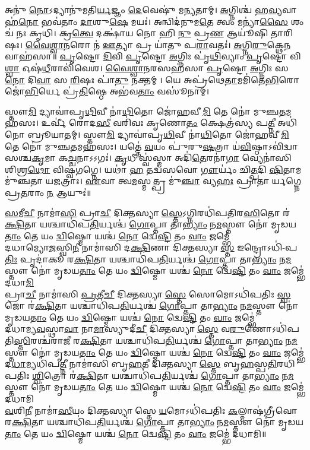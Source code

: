 𑌅𑌨𑍁॑ \ul{𑌨𑍋}𑌽𑌦𑍍𑌯𑌾𑌨𑍁॑𑌮𑌤𑌿\ul{𑌰𑍍𑌯}𑌜𑍍𑌞𑌂 \ul{𑌦𑍇}𑌵𑍇𑌷𑍁॑ 𑌮𑌨𑍍𑌯𑌤𑌾𑌮𑍍। \ul{𑌅}𑌗𑍍𑌨𑌿𑌶𑍍𑌚॑ 𑌹\ul{𑌵𑍍𑌯}𑌵𑌾𑌹॑\ul{𑌨𑍋} 𑌭𑌵॑𑌤𑌾𑌂 \ul{𑌦𑌾}𑌶𑍁\ul{𑌷𑍇} 𑌮𑌯𑌃॑। 𑌅𑌨𑍍𑌵𑌿𑌦॑𑌨𑍁𑌮\ul{𑌤𑍇} 𑌤𑍍𑌵𑌂 𑌮𑌨𑍍𑌯𑌾॑\ul{𑌸𑍈} 𑌶𑌂 𑌚॑ 𑌨𑌃 𑌕𑍃𑌧𑌿। 𑌕𑍍𑌰\ul{𑌤𑍍𑌵𑍇} 𑌦𑌕𑍍𑌷𑌾॑𑌯 𑌨𑍋 𑌹𑌿 \ul{𑌨𑍁} 𑌪𑍍𑌰\ul{𑌣} 𑌆𑌯𑍂॑𑌷𑌿 𑌤𑌾𑌰𑌿𑌷𑌃।
\ul{𑌵𑍈}\ul{𑌶𑍍𑌵𑌾}\ul{𑌨}𑌰𑍋 𑌨॑ \ul{𑌊}𑌤𑍍𑌯𑌾 𑌪𑍍𑌰 𑌯𑌾॑𑌤𑍁  𑌪\ul{𑌰𑌾}𑌵𑌤𑌃॑। \ul{𑌅}𑌗𑍍𑌨𑌿\ul{𑌰𑍁}𑌕𑍍𑌥𑍇\ul{𑌨} 𑌵𑌾𑌹॑𑌸𑌾॥
\ul{𑌪𑍃}𑌷𑍍𑌟𑍋 \ul{𑌦𑌿}𑌵𑌿 \ul{𑌪𑍃}𑌷𑍍𑌟𑍋 \ul{𑌅}𑌗𑍍𑌨𑌿𑌃 𑌪𑍃॑\ul{𑌥𑌿}𑌵𑍍𑌯𑌾𑌂 \ul{𑌪𑍃}𑌷𑍍𑌟𑍋 𑌵𑌿\ul{𑌶𑍍𑌵𑌾} 𑌓𑌷॑\ul{𑌧𑍀}𑌰𑌾𑌵𑌿॑𑌵𑍇𑌶। \ul{𑌵𑍈}\ul{𑌶𑍍𑌵𑌾}\ul{𑌨}𑌰𑌸𑌹॑𑌸𑌾 \ul{𑌪𑍃}𑌷𑍍𑌟𑍋 \ul{𑌅}𑌗𑍍𑌨𑌿𑌃 𑌸 \ul{𑌨𑍋} 𑌦𑌿\ul{𑌵𑌾} 𑌸 \ul{𑌰𑌿}𑌷𑌃 𑌪𑌾॑\ul{𑌤𑍁} 𑌨𑌕𑍍𑌤𑌮𑍍।  𑌯𑍇 𑌅𑌪𑍍𑌰॑𑌥𑍇\ul{𑌤𑌾}𑌮𑌮𑌿॑𑌤𑍇\ul{𑌭𑌿}𑌰𑍋𑌜𑍋॑\ul{𑌭𑌿}𑌰𑍍𑌯𑍇 𑌪𑍍𑌰॑\ul{𑌤𑌿}𑌷𑍍𑌠𑍇 𑌅𑌭॑𑌵\ul{𑌤𑌾𑌂} 𑌵𑌸𑍂॑𑌨𑌾𑌮𑍍। 

𑌸𑍍𑌤𑍗\ul{𑌮𑌿} 𑌦𑍍𑌯𑌾𑌵𑌾॑𑌪𑍃\ul{𑌥𑌿}𑌵𑍀 𑌨𑌾॑\ul{𑌥𑌿}𑌤𑍋 𑌜𑍋॑𑌹𑌵𑍀\ul{𑌮𑌿} 𑌤𑍇 𑌨𑍋॑ 𑌮𑍁𑌞𑍍𑌚\ul{𑌤}𑌮𑌹॑𑌸𑌃। 𑌉𑌰𑍍𑌵𑍀॑ 𑌰𑍋𑌦\ul{𑌸𑍀} 𑌵𑌰𑌿॑𑌵𑌃 𑌕𑍃𑌣𑍋\ul{𑌤𑌂} 𑌕𑍍𑌷𑍇𑌤𑍍𑌰॑𑌸𑍍𑌯 𑌪\ul{𑌤𑍍𑌨𑍀} 𑌅𑌧𑌿॑ 𑌨𑍋 𑌬𑍍𑌰𑍂𑌯𑌾𑌤𑌮𑍍। 
𑌸𑍍𑌤𑍗\ul{𑌮𑌿} 𑌦𑍍𑌯𑌾𑌵𑌾॑𑌪𑍃\ul{𑌥𑌿}𑌵𑍀 𑌨𑌾॑\ul{𑌥𑌿}𑌤𑍋 𑌜𑍋॑𑌹𑌵𑍀\ul{𑌮𑌿} 𑌤𑍇 𑌨𑍋॑ 𑌮𑍁𑌞𑍍𑌚\ul{𑌤}𑌮𑌹॑𑌸𑌃। 𑌯𑌤𑍍𑌤𑍇॑ \ul{𑌵}𑌯𑌂 𑌪𑍁॑𑌰𑍁\ul{𑌷}𑌤𑍍𑌰𑌾 𑌯॑\ul{𑌵𑌿}𑌷𑍍𑌠𑌾𑌽𑌵𑌿॑𑌦𑍍𑌵𑌾𑌸𑌶𑍍𑌚\ul{𑌕𑍃}𑌮𑌾 𑌕\ul{𑌚𑍍𑌚}𑌨𑌾𑌽𑌽𑌗𑌃॑। 
\ul{𑌕𑍃}𑌧𑍀 𑌸𑍍𑌵॑𑌸𑍍𑌮𑌾 𑌅𑌦𑌿॑\ul{𑌤𑍇}𑌰𑌨𑌾॑\ul{𑌗𑌾} 𑌵𑍍𑌯𑍇𑌨𑌾॑𑌸𑌿 𑌶𑌿𑌶𑍍𑌰\ul{𑌥𑍋} 𑌵𑌿𑌷𑍍𑌵॑𑌗𑌗𑍍𑌨𑍇। 𑌯𑌥𑌾॑ \ul{𑌹} 𑌤𑌦𑍍𑌵॑𑌸𑌵𑍋 \ul{𑌗𑍗}𑌰𑍍𑌯𑌂॑ 𑌚𑌿\ul{𑌤𑍍𑌪}𑌦𑌿 \ul{𑌷𑌿}𑌤𑌾𑌮𑌮𑍁॑𑌞𑍍𑌚𑌤𑌾 𑌯𑌜𑌤𑍍𑌰𑌾𑌃। \ul{𑌏}𑌵𑌾 𑌤𑍍𑌵\ul{𑌮}𑌸𑍍𑌮𑌤𑍍𑌪𑍍𑌰 𑌮𑍁॑\ul{𑌞𑍍𑌚𑌾} 𑌵𑍍𑌯\ul{𑌹𑌃} 𑌪𑍍𑌰𑌾𑌤𑌾𑌰𑍍𑌯𑌗𑍍𑌨𑍇 𑌪𑍍𑌰\ul{𑌤}𑌰𑌾𑌂 \ul{𑌨} 𑌆𑌯𑍁𑌃॑॥

\ul{𑌸}𑌮𑍀\ul{𑌚𑍀} 𑌨𑌾𑌮𑌾॑\ul{𑌸𑌿} 𑌪𑍍𑌰𑌾\ul{𑌚𑍀} 𑌦𑌿𑌕𑍍𑌤𑌸𑍍𑌯𑌾\ul{𑌸𑍍𑌤𑍇}𑌽𑌗𑍍𑌨𑌿𑌰𑌧𑌿॑\-𑌪𑌤𑌿𑌰\ul{𑌸𑌿}𑌤𑍋 𑌰॑\ul{𑌕𑍍𑌷𑌿}𑌤𑌾 
𑌯𑌶𑍍𑌚𑌾𑌧𑌿॑𑌪\ul{𑌤𑌿}𑌰𑍍𑌯𑌶𑍍𑌚॑ \ul{𑌗𑍋}𑌪𑍍𑌤𑌾 𑌤𑌾\ul{𑌭𑍍𑌯𑌾𑌂} 𑌨\ul{𑌮}𑌸𑍍𑌤𑍗 𑌨𑍋॑ 𑌮𑍃𑌡𑌯\ul{𑌤𑌾𑌂} 𑌤𑍇 
𑌯𑌂 \ul{𑌦𑍍𑌵𑌿}𑌷𑍍𑌮𑍋 𑌯𑌶𑍍𑌚॑ \ul{𑌨𑍋} 𑌦𑍍𑌵𑍇\ul{𑌷𑍍𑌟𑌿} 𑌤𑌂 \ul{𑌵𑌾𑌂} 𑌜𑌮𑍍𑌭𑍇॑\\
𑌦𑌧𑌾𑌮𑍍𑌯𑍋\ul{𑌜}𑌸𑍍𑌵𑌿\ul{𑌨𑍀} 𑌨𑌾𑌮𑌾॑𑌸𑌿 𑌦\ul{𑌕𑍍𑌷𑌿}𑌣𑌾 𑌦𑌿𑌕𑍍𑌤𑌸𑍍𑌯𑌾\ul{𑌸𑍍𑌤} 𑌇𑌨𑍍𑌦𑍍𑌰𑍋𑌽𑌧𑌿॑-𑌪\ul{𑌤𑌿𑌃} 𑌪𑍃𑌦𑌾॑𑌕𑍂 𑌰\ul{𑌕𑍍𑌷𑌿}𑌤𑌾 
𑌯𑌶𑍍𑌚𑌾𑌧𑌿॑𑌪\ul{𑌤𑌿}𑌰𑍍𑌯𑌶𑍍𑌚॑ \ul{𑌗𑍋}𑌪𑍍𑌤𑌾 𑌤𑌾\ul{𑌭𑍍𑌯𑌾𑌂} 𑌨\ul{𑌮}𑌸𑍍𑌤𑍗 𑌨𑍋॑ 𑌮𑍃𑌡𑌯\ul{𑌤𑌾𑌂} 𑌤𑍇 
𑌯𑌂 \ul{𑌦𑍍𑌵𑌿}𑌷𑍍𑌮𑍋 𑌯𑌶𑍍𑌚॑ \ul{𑌨𑍋} 𑌦𑍍𑌵𑍇\ul{𑌷𑍍𑌟𑌿} 𑌤𑌂 \ul{𑌵𑌾𑌂} 𑌜𑌮𑍍𑌭𑍇॑ 𑌦𑌧𑌾\ul{𑌮𑌿}\\ 
𑌪𑍍𑌰𑌾\ul{𑌚𑍀} 𑌨𑌾𑌮𑌾॑𑌸𑌿 \ul{𑌪𑍍𑌰}𑌤𑍀\ul{𑌚𑍀} 𑌦𑌿𑌕𑍍𑌤𑌸𑍍𑌯𑌾\ul{𑌸𑍍𑌤𑍇} 𑌸𑍋𑌮𑍋𑌽𑌧𑌿॑\-𑌪𑌤𑌿𑌃 \ul{𑌸𑍍𑌵}𑌜𑍋 𑌰॑\ul{𑌕𑍍𑌷𑌿}𑌤𑌾 
𑌯𑌶𑍍𑌚𑌾𑌧𑌿॑𑌪\ul{𑌤𑌿}𑌰𑍍𑌯𑌶𑍍𑌚॑ \ul{𑌗𑍋}𑌪𑍍𑌤𑌾 𑌤𑌾\ul{𑌭𑍍𑌯𑌾𑌂} 𑌨\ul{𑌮}𑌸𑍍𑌤𑍗 𑌨𑍋॑ 𑌮𑍃𑌡𑌯\ul{𑌤𑌾𑌂} 𑌤𑍇 
𑌯𑌂 \ul{𑌦𑍍𑌵𑌿}𑌷𑍍𑌮𑍋 𑌯𑌶𑍍𑌚॑ \ul{𑌨𑍋} 𑌦𑍍𑌵𑍇\ul{𑌷𑍍𑌟𑌿} 𑌤𑌂 \ul{𑌵𑌾𑌂} 𑌜𑌮𑍍𑌭𑍇॑\\
𑌦𑌧𑌾𑌮𑍍𑌯\ul{𑌵}𑌸𑍍𑌥𑌾\ul{𑌵𑌾} 𑌨𑌾\ul{𑌮𑌾}𑌸𑍍𑌯𑍁𑌦𑍀॑\ul{𑌚𑍀} 𑌦𑌿𑌕𑍍𑌤𑌸𑍍𑌯𑌾\ul{𑌸𑍍𑌤𑍇} 𑌵\ul{𑌰𑍁}𑌣𑍋𑌽𑌧𑌿॑\-𑌪𑌤𑌿\ul{𑌸𑍍𑌤𑌿}𑌰𑌶𑍍𑌚॑𑌰𑌾𑌜𑍀 𑌰\ul{𑌕𑍍𑌷𑌿}𑌤𑌾 
𑌯𑌶𑍍𑌚𑌾𑌧𑌿॑𑌪\ul{𑌤𑌿}𑌰𑍍𑌯𑌶𑍍𑌚॑ \ul{𑌗𑍋}𑌪𑍍𑌤𑌾 𑌤𑌾\ul{𑌭𑍍𑌯𑌾𑌂} 𑌨\ul{𑌮}𑌸𑍍𑌤𑍗 𑌨𑍋॑ 𑌮𑍃𑌡𑌯\ul{𑌤𑌾𑌂} 𑌤𑍇 
𑌯𑌂 \ul{𑌦𑍍𑌵𑌿}𑌷𑍍𑌮𑍋 𑌯𑌶𑍍𑌚॑ \ul{𑌨𑍋} 𑌦𑍍𑌵𑍇\ul{𑌷𑍍𑌟𑌿} 𑌤𑌂 \ul{𑌵𑌾𑌂} 𑌜𑌮𑍍𑌭𑍇॑\\
𑌦\ul{𑌧𑌾}𑌮𑍍𑌯𑌧𑌿॑𑌪\ul{𑌤𑍍𑌨𑍀} 𑌨𑌾𑌮𑌾॑𑌸𑌿 𑌬𑍃\ul{𑌹}𑌤𑍀 𑌦𑌿𑌕𑍍𑌤𑌸𑍍𑌯𑌾\ul{𑌸𑍍𑌤𑍇} 𑌬𑍃\ul{𑌹}𑌸𑍍𑌪\ul{𑌤𑌿}𑌰𑌧𑌿॑𑌪𑌤𑌿𑌃 \ul{𑌶𑍍𑌵𑌿}𑌤𑍍𑌰𑍋 𑌰॑\ul{𑌕𑍍𑌷𑌿}𑌤𑌾 
𑌯𑌶𑍍𑌚𑌾𑌧𑌿॑𑌪\ul{𑌤𑌿}𑌰𑍍𑌯𑌶𑍍𑌚॑ \ul{𑌗𑍋}𑌪𑍍𑌤𑌾 𑌤𑌾\ul{𑌭𑍍𑌯𑌾𑌂} 𑌨\ul{𑌮}𑌸𑍍𑌤𑍗 𑌨𑍋॑ 𑌮𑍃𑌡𑌯\ul{𑌤𑌾𑌂} 𑌤𑍇 
𑌯𑌂 \ul{𑌦𑍍𑌵𑌿}𑌷𑍍𑌮𑍋 𑌯𑌶𑍍𑌚॑ \ul{𑌨𑍋} 𑌦𑍍𑌵𑍇\ul{𑌷𑍍𑌟𑌿} 𑌤𑌂 \ul{𑌵𑌾𑌂} 𑌜𑌮𑍍𑌭𑍇॑ 𑌦𑌧𑌾𑌮𑌿\\
\ul{𑌵}𑌶𑌿\ul{𑌨𑍀} 𑌨𑌾𑌮𑌾॑\ul{𑌸𑍀}𑌯𑌂 𑌦𑌿𑌕𑍍𑌤𑌸𑍍𑌯𑌾𑌸𑍍𑌤𑍇 \ul{𑌯}𑌮𑍋𑌽𑌧𑌿॑𑌪𑌤𑌿𑌃 \ul{𑌕}𑌲𑍍𑌮𑌾𑌷॑𑌗𑍍𑌰𑍀𑌵𑍋 𑌰\ul{𑌕𑍍𑌷𑌿}𑌤𑌾 
𑌯𑌶𑍍𑌚𑌾𑌧𑌿॑𑌪\ul{𑌤𑌿}𑌰𑍍𑌯𑌶𑍍𑌚॑ \ul{𑌗𑍋}𑌪𑍍𑌤𑌾 𑌤𑌾\ul{𑌭𑍍𑌯𑌾𑌂} 𑌨\ul{𑌮}𑌸𑍍𑌤𑍗 𑌨𑍋॑ 𑌮𑍃𑌡𑌯\ul{𑌤𑌾𑌂} 𑌤𑍇 
𑌯𑌂 \ul{𑌦𑍍𑌵𑌿}𑌷𑍍𑌮𑍋 𑌯𑌶𑍍𑌚॑ \ul{𑌨𑍋} 𑌦𑍍𑌵𑍇\ul{𑌷𑍍𑌟𑌿} 𑌤𑌂 \ul{𑌵𑌾𑌂} 𑌜𑌮𑍍𑌭𑍇॑ 𑌦𑌧𑌾𑌮𑌿॥

